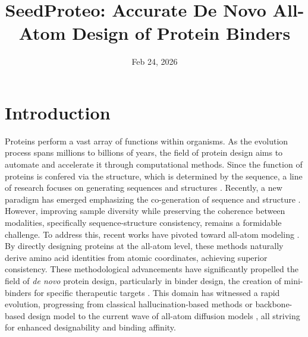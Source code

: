 \documentclass[]{bytedance_seed}
\title{SeedProteo: Accurate De Novo All-Atom Design of Protein Binders}
\affiliation[1]{ByteDance Seed}
\date{Feb 24, 2026}
\begin{document}
\maketitle




\vspace{-50pt}


\newpage
\section{Introduction}
Proteins perform a vast array of functions within organisms. As the evolution process spans millions to billions of years, the field of protein design aims to automate and accelerate it through computational methods. Since the function of proteins is confered via the structure, which is determined by the sequence, a line of research focuses on generating sequences \citep{dauparasRobustDeepLearning2022, zhengStructureinformedLanguageModels2023, alamdariProteinGenerationEvolutionary2024, wang2024dplm} and structures \cite{yimSE3DiffusionModel2023b, watsonNovoDesignProtein2023, ingrahamIlluminatingProteinSpace2023, zhang2025odesign}. Recently, a new paradigm has emerged emphasizing the co-generation of sequence and structure \cite{wang2025dplm2, hsieh2025dplm2_1, chen2025apm, multiflow}. However, improving sample diversity while preserving the coherence between modalities, specifically sequence-structure consistency, remains a formidable challenge. To address this, recent works have pivoted toward all-atom modeling \cite{quPallatomUnlockingNew2025, geffnerLaProteinaAtomisticProtein2025}. By directly designing proteins at the all-atom level, these methods naturally derive amino acid identities from atomic coordinates, achieving superior consistency. These methodological advancements have significantly propelled the field of \textit{de novo} protein design, particularly in binder design, the creation of mini-binders for specific therapeutic targets \cite{zambaldi2024novo}. This domain has witnessed a rapid evolution, progressing from classical hallucination-based methods \cite{pacesaOneshotDesignFunctional2025} or backbone-based design model \cite{zhang2025odesign, ren2025pxdesign} to the current wave of all-atom diffusion models \cite{butcher2025novo, chai2025zero, team2025latent}, all striving for enhanced designability and binding affinity.
\end{document}
